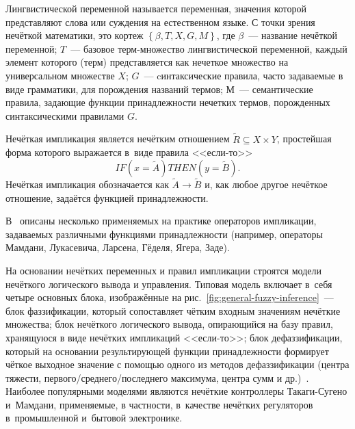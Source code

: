 \begin{mydef}
Лингвистической переменной называется переменная, значения которой представляют слова или суждения на естественном языке. С точки зрения нечёткой математики, это кортеж $\left\lbrace \beta, T, X, G, M \right\rbrace$, где $\beta$~--- название нечёткой переменной; $T$~--- базовое терм-множество лингвистической переменной, каждый элемент которого (терм) представляется как нечеткое множество на универсальном множестве $X$; $G$~--- cинтаксические правила, часто задаваемые в виде грамматики, для порождения названий термов; $М$~--- семантические правила, задающие функции принадлежности нечетких термов, порожденных синтаксическими правилами $G$.
\end{mydef}

\begin{mydef}
Нечёткая импликация является нечётким отношением $\tilde R \subseteq X \times Y$, простейшая форма которого выражается в~виде правила <<если-то>>~\cite{Pegat}
\begin{equation}
  IF \left( x = \tilde A \right) THEN \left( y = \tilde B\right).
\end{equation}
Нечёткая импликация обозначается как $\tilde A \rightarrow \tilde B$ и, как любое другое нечёткое отношение, задаётся функцией принадлежности.
\end{mydef}
В~\cite{Pegat, Rutkovskaya} описаны несколько применяемых на практике операторов импликации, задаваемых различными функциями принадлежности (например, операторы Мамдани, Лукасевича, Ларсена, Гёделя, Ягера, Заде).

На основании нечётких переменных и правил импликации строятся модели нечёткого логического вывода и управления. Типовая модель включает в~себя четыре основных блока, изображённые на рис.~\ref{fig:general-fuzzy-inference}~--- блок фаззификации, который сопоставляет чётким входным значениям нечёткие множества; блок нечёткого логического вывода, опирающийся на базу правил, хранящуюся в виде нечётких импликаций <<если-то>>; блок дефаззификации, который на основании результирующей функции принадлежности формирует чёткое выходное значение с помощью одного из методов дефаззификации (центра тяжести, первого/среднего/последнего максимума, центра сумм и др.)~\cite{Pegat, Rutkovskaya}. Наиболее популярными моделями являются нечёткие контроллеры Такаги-Сугено и~Мамдани, применяемые, в частности, в~качестве нечётких регуляторов в~промышленной и~бытовой электронике.

\begin{figure}[h!]
\end{figure}

